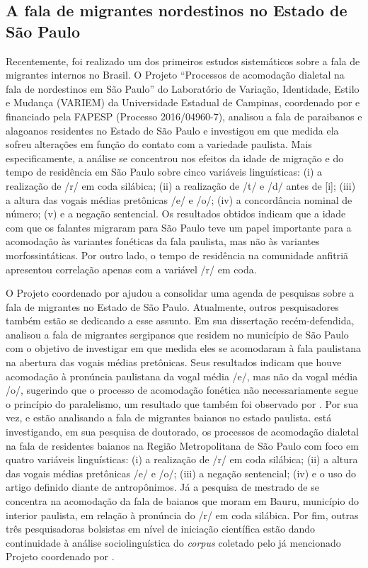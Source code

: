 \documentclass[
		a4paper,	%
		12pt,		%
		]{article}	%
\begin{document}
	\subsection{A fala de migrantes nordestinos no Estado de São Paulo}
	\label{estudos-sp}

	Recentemente, foi realizado um dos primeiros estudos sistemáticos sobre a fala
	de migrantes internos no Brasil. O Projeto \enquote{Processos de acomodação
	dialetal na fala de nordestinos em São Paulo} do Laboratório de Variação,
	Identidade, Estilo e Mudança (VARIEM) da Universidade Estadual de Campinas,
	coordenado por \citet{Oushiro2018} e financiado pela FAPESP (Processo
	2016/04960-7), analisou a fala de paraibanos e alagoanos residentes no Estado de
	São Paulo e investigou em que medida ela sofreu alterações em função do contato
	com a variedade paulista.  Mais especificamente, a análise se concentrou nos
	efeitos da idade de migração e do tempo de residência em São Paulo sobre cinco
	variáveis linguísticas: (i) a realização de /r/ em coda silábica; (ii) a
	realização de /t/ e /d/ antes de [i]; (iii) a altura das vogais médias
	pretônicas /e/ e /o/; (iv) a concordância nominal de número; (v) e a negação
	sentencial. Os resultados obtidos indicam que a idade com que os falantes
	migraram para São Paulo teve um papel importante para a acomodação às variantes
	fonéticas da fala paulista, mas não às variantes morfossintáticas. Por outro
	lado, o tempo de residência na comunidade anfitriã apresentou correlação apenas
	com a variável /r/ em coda.

	O Projeto coordenado por \citet{Oushiro2018} ajudou a consolidar uma agenda
	de pesquisas sobre a fala de migrantes no Estado de São Paulo. Atualmente,
	outros pesquisadores também estão se dedicando a esse assunto. Em sua
	dissertação recém-defendida, \citet{Santana2019} analisou a fala de
	migrantes sergipanos que residem no município de São Paulo com o objetivo de
	investigar em que medida eles se acomodaram à fala paulistana na abertura
	das vogais médias pretônicas.  Seus resultados indicam que houve acomodação
	à pronúncia paulistana da vogal média /e/, mas não da vogal média /o/,
	sugerindo que o processo de acomodação fonética não necessariamente segue o
	princípio do paralelismo, um resultado que também foi observado por
	\citet{Oushiro2019}. Por sua vez, \citet{Souza2017} e \citet{Oliveira2019}
	estão analisando a fala de migrantes baianos no estado paulista.
	\citet{Souza2017} está investigando, em sua pesquisa de doutorado, os
	processos de acomodação dialetal na fala de residentes baianos na Região
	Metropolitana de São Paulo com foco em quatro variáveis linguísticas: (i) a
	realização de /r/ em coda silábica; (ii) a altura das vogais médias
	pretônicas /e/ e /o/; (iii) a negação sentencial; (iv) e o uso do artigo
	definido diante de antropônimos. Já a pesquisa de mestrado de
	\citet{Oliveira2019} se concentra na acomodação da fala de baianos que moram
	em Bauru, município do interior paulista, em relação à pronúncia do /r/ em
	coda silábica. Por fim, outras três pesquisadoras bolsistas em nível de
	iniciação científica estão dando continuidade à análise sociolinguística do
	\emph{corpus} coletado pelo já mencionado Projeto coordenado por
	\citet{Oushiro2018}.
	
\end{document}

